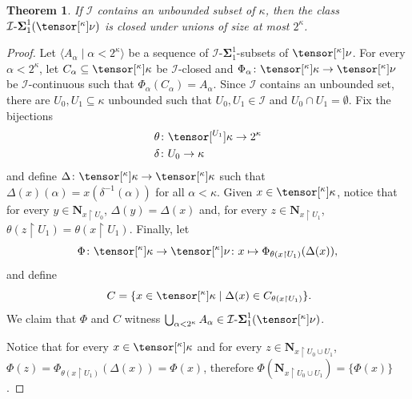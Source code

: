 \documentclass{amsart}
\numberwithin{equation}{section}
\newcommand{\I}{\mathcal{I}}
\newcommand{\pre}[2]{\tensor[^{#1}]{#2}{}}
\newcommand{\seq}[2]{\langle #1 \mid #2 \rangle}
\newcommand{\Nbhd}{\boldsymbol{N}}
\newcommand{\1}{\mathbf{I}}
\newcommand{\2}{\mathbf{II}}
\newcommand{\Siid}[2]{\I\text{-}\boldsymbol{\Sigma}^{ #1 }_{ #2}}
\renewcommand{\a}{\alpha}
\renewcommand{\d}{\delta}
\renewcommand{\k}{\kappa}
\newcommand{\pow}{\mathscr{P}}
\newcommand{\clopen}[1]{\Nbhd_{#1}}
\newtheorem{theorem}{Theorem}[section]
\theoremstyle{definition}
\theoremstyle{remark}
\begin{document}
\begin{theorem}\label{anal_closure}
If \(\I\) contains an unbounded subset of \(\k\), then the class \(\Siid{1}{1}(\pre{\k}{\nu})\) is closed under unions of size at most \( 2^\kappa\).%
\end{theorem}
\begin{proof} 
Let \(\seq{A_\a}{\a<2^\k}\) be a sequence of \(\Siid{1}{1}\)-subsets of \(\pre{\k}{\nu}\). For every \(\a<2^\k\), let \(C_\a\subseteq \pre{\k}{\k}\) be \(\I\)-closed and \(\Phi_\a \colon \pre{\k}{\k} \to \pre{\k}{\nu}\) be \(\I\)-continuous such that \(\Phi_\a(C_\a)=A_\a\). 
Since $\I$ contains an unbounded set, there are \(U_0,U_1 \subseteq \k\) unbounded such that \(U_0,U_1 \in \I\) and \(U_0\cap U_1 =\emptyset\). %
Fix the bijections
\begin{align*}
    &\theta \colon \pre{U_1}{\k} \to 2^\kappa \\
    &\d \colon U_0 \to \k
\end{align*}
and define 
\(\Delta \colon \pre{\k}{\k} \to \pre{\k}{\k}\) such that %
\(\Delta(x)(\a)=x(\d^{-1}(\a))\) for all \(\a<\k\).
Given \(x \in \pre{\k}{\k}\), notice that for every \(y \in \clopen{x \restriction U_0}\), \(\Delta(y)=\Delta(x)\) and, for every \(z \in \clopen{x \restriction U_1}\), \(\theta(z\restriction U_1)=\theta(x\restriction U_1)\).
Finally, let
\[
\Phi \colon \pre{\k}{\k} \to \pre{\k}{\nu} \colon x \mapsto \Phi_{\theta(x\restriction U_1)}(\Delta(x)),
\]
and define 
\[
\; C=\{ x \in \pre{\k}{\k} \mid \Delta(x)\in C_{\theta(x\restriction U_1)}\}.
\]
We claim that \(\Phi\) and \(C\) witness \(\bigcup_{\a<2^\k}A_\a \in \Siid{1}{1}(\pre{\k}{\nu})\). 

Notice that for every \(x \in\pre{\k}{\k} \) and for every \(z \in \clopen{x \restriction U_0 \cup U_1}\),
\(\Phi(z)=\Phi_{\theta(x\restriction U_1)}(\Delta(x))=\Phi(x)\), therefore \(\Phi(\clopen{x \restriction U_0 \cup U_1})=\{\Phi(x)\}\). 


\end{proof}
\end{document}
